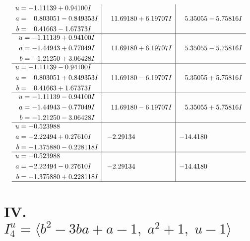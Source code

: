\documentclass[1p]{elsarticle_modified}
\theoremstyle{definition}
\begin{document}
$$\begin{array}{c|c|c}
\begin{aligned}
u &= -1.11139 + 0.94100 I \\
a &= \phantom{-}0.803051 - 0.849353 I \\
b &= \phantom{-}0.41663 - 1.67373 I\end{aligned}
 & \phantom{-}11.69180 + 6.19707 I & \phantom{-}5.35055 - 5.75816 I \\ \hline\begin{aligned}
u &= -1.11139 + 0.94100 I \\
a &= -1.44943 + 0.77049 I \\
b &= -1.21250 + 3.06428 I\end{aligned}
 & \phantom{-}11.69180 + 6.19707 I & \phantom{-}5.35055 - 5.75816 I \\ \hline\begin{aligned}
u &= -1.11139 - 0.94100 I \\
a &= \phantom{-}0.803051 + 0.849353 I \\
b &= \phantom{-}0.41663 + 1.67373 I\end{aligned}
 & \phantom{-}11.69180 - 6.19707 I & \phantom{-}5.35055 + 5.75816 I \\ \hline\begin{aligned}
u &= -1.11139 - 0.94100 I \\
a &= -1.44943 - 0.77049 I \\
b &= -1.21250 - 3.06428 I\end{aligned}
 & \phantom{-}11.69180 - 6.19707 I & \phantom{-}5.35055 + 5.75816 I \\ \hline\begin{aligned}
u &= -0.523988\phantom{ +0.000000I} \\
a &= -2.22494 + 0.27610 I \\
b &= -1.375880 - 0.228118 I\end{aligned}
 & -2.29134\phantom{ +0.000000I} & -14.4180\phantom{ +0.000000I} \\ \hline\begin{aligned}
u &= -0.523988\phantom{ +0.000000I} \\
a &= -2.22494 - 0.27610 I \\
b &= -1.375880 + 0.228118 I\end{aligned}
 & -2.29134\phantom{ +0.000000I} & -14.4180\phantom{ +0.000000I}\\
 \hline 
 \end{array}$$\newpage\newpage\renewcommand{\arraystretch}{1}
\centering \section*{IV. $I^u_{4}= \langle b^2-3 b a+a-1,\;a^2+1,\;u-1 \rangle$}
\end{document}
